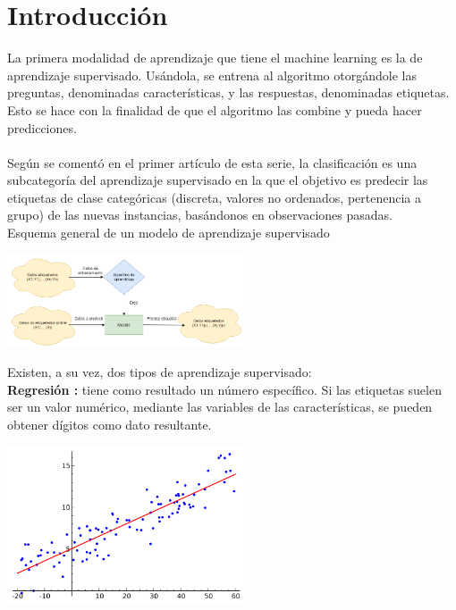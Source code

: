 \documentclass[%
 reprint,
 amsmath,amssymb,
 aps,
]{revtex4-1}
\begin{document}
\section {Introducción}\label{sec:1}
La primera modalidad de aprendizaje que tiene el machine learning es la de aprendizaje supervisado. Usándola, se entrena al algoritmo otorgándole las preguntas, denominadas características, y las respuestas, denominadas etiquetas. Esto se hace con la finalidad de que el algoritmo las combine y pueda hacer predicciones.\\\\
Según se comentó en el primer artículo de esta serie, la clasificación es una subcategoría del aprendizaje supervisado en la que el objetivo es predecir las etiquetas de clase categóricas (discreta, valores no ordenados, pertenencia a grupo) de las nuevas instancias, basándonos en observaciones pasadas.\\
Esquema general de un modelo de aprendizaje supervisado
\begin{center}
\includegraphics[width=7cm]{./Imagenes/esquemageneraldelmodelosupervisado}
\end{center}
 
Existen, a su vez, dos tipos de aprendizaje supervisado:\\
 \textbf{Regresión : }tiene como resultado un número específico. Si las etiquetas suelen ser un valor numérico, mediante las variables de las características, se pueden obtener dígitos como dato resultante.\\
 
 
\begin{center}
\includegraphics[width=7cm]{./Imagenes/regresion}
\end{center}
 
\end{document}
